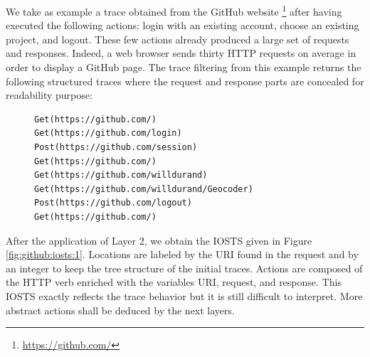 \begin{example}
We take as example a trace obtained from the GitHub website
\footnote{\url{https://github.com/}} after having executed the
following actions: login with an existing account, choose an
existing project, and logout. These few actions already produced
a large set of requests and responses. Indeed, a web browser
sends thirty HTTP requests on average in order to display a
GitHub page. The trace filtering from this example returns the
following structured traces where the request and response parts
are concealed for readability purpose:

\begin{figure}[ht]
\begin{BVerbatim}
Get(https://github.com/)
Get(https://github.com/login)
Post(https://github.com/session)
Get(https://github.com/)
Get(https://github.com/willdurand)
Get(https://github.com/willdurand/Geocoder)
Post(https://github.com/logout)
Get(https://github.com/)
\end{BVerbatim}
\end{figure}

After the application of Layer 2, we obtain the IOSTS given in Figure
\ref{fig:github:iosts:1}. Locations are labeled by the URI found
in the request and by an integer to keep the tree structure of
the initial traces. Actions are composed of the HTTP verb
enriched with the variables URI, request, and response. This
IOSTS exactly reflects the trace behavior but it is still
difficult to interpret. More abstract actions shall be deduced by
the next layers.
\end{example}


